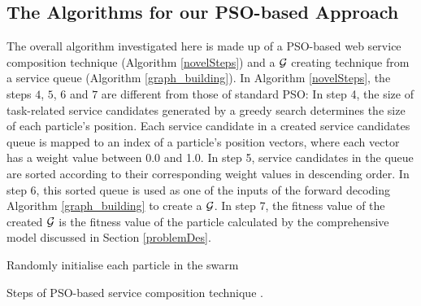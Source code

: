 \subsection{The Algorithms for our PSO-based Approach}\label{PSO-based_algomargin}
The overall algorithm investigated here is made up of a PSO-based web service composition technique (Algorithm \ref{novelSteps}) and a $\mathcal{G}$ creating technique from a service queue (Algorithm \ref{graph_building}). In Algorithm \ref{novelSteps}, the  steps $4$, $5$, $6$ and $7$ are different from those of standard PSO: In step 4, the size of task-related service candidates generated by a greedy search determines the size of each particle's position. Each service candidate in a created service candidates queue is mapped to an index of a particle’s position vectors, where each vector has a weight value between 0.0 and 1.0. In step 5, service candidates in the queue are sorted according to their corresponding weight values in descending order. In step 6, this sorted queue is used as one of the inputs of the forward decoding Algorithm \ref{graph_building} to create a $\mathcal{G}$. In step 7, the fitness value of the created $\mathcal{G}$ is the fitness value of the particle calculated by the comprehensive model discussed in Section \ref{problemDes}.
\begin{algorithm}
 \SetNlSty{}{}{:}
 Randomly initialise each particle in the swarm\;
\caption{Steps of PSO-based service composition technique \cite{da2016particle}.}
\label{novelSteps}
\end{algorithm} 

